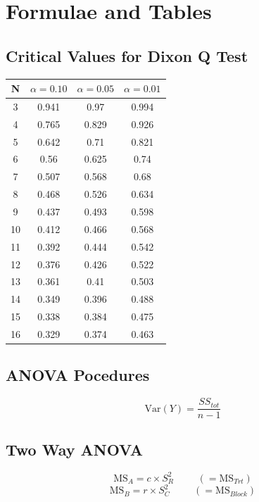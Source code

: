 \documentclass[a4paper,12pt]{article}
\begin{document}
\newpage
\section*{Formulae and Tables}
\subsection*{Critical Values for Dixon Q Test}
{
	\Large
	\begin{center}
		\begin{tabular}{|c|c|c|c|}
			\hline  N  & $\alpha=0.10$  & $\alpha=0.05$  & $\alpha=0.01$  \\ \hline
			3  & 0.941 & 0.97  & 0.994 \\ \hline
			4  & 0.765 & 0.829 & 0.926 \\ \hline
			5  & 0.642 & 0.71  & 0.821 \\ \hline
			6  & 0.56  & 0.625 & 0.74  \\ \hline
			7  & 0.507 & 0.568 & 0.68  \\ \hline
			8  & 0.468 & 0.526 & 0.634 \\ \hline
			9  & 0.437 & 0.493 & 0.598 \\ \hline
			10 & 0.412 & 0.466 & 0.568 \\ \hline
			11 & 0.392 & 0.444 & 0.542 \\ \hline
			12 & 0.376 & 0.426 & 0.522 \\ \hline
			13 & 0.361 & 0.41  & 0.503 \\ \hline
			14 & 0.349 & 0.396 & 0.488 \\ \hline
			15 & 0.338 & 0.384 & 0.475 \\ \hline
			16 & 0.329 & 0.374 & 0.463 \\ \hline
		\end{tabular} 
	\end{center}
}
\subsection*{ANOVA Pocedures}
\[ \mbox{Var}(Y) = \frac{SS_{tot}}{n-1} \]
\subsection*{Two Way ANOVA}
\[ \textrm{MS}_{A} =  c \times S^2_{R} \phantom{space} (= \textrm{MS}_{Trt} )\]
\[ \textrm{MS}_{B} =  r \times S^2_{C} \phantom{space} (= \textrm{MS}_{Block})\]
\end{document}
